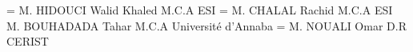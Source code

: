 \documentclass[a4paper,11pt,twoside]{../use/ESIthesis}
\begin{document}
\fi

\begin{titlepage}

\ThesisESI

\President = {M. HIDOUCI Walid Khaled \tab{1em}  M.C.A \tab{1em} ESI} 
\Examinateurs = {
M. CHALAL Rachid \tab{4em} M.C.A  \tab{1em}  ESI \\
M. BOUHADADA Tahar \tab{2em} M.C.A \tab{1em} Université d’Annaba
} 
\Directeur = {M. NOUALI Omar \tab{5em} D.R \tab{2em} CERIST}

\MakeThesisTitlePage 

\end{titlepage}
\end{document}
